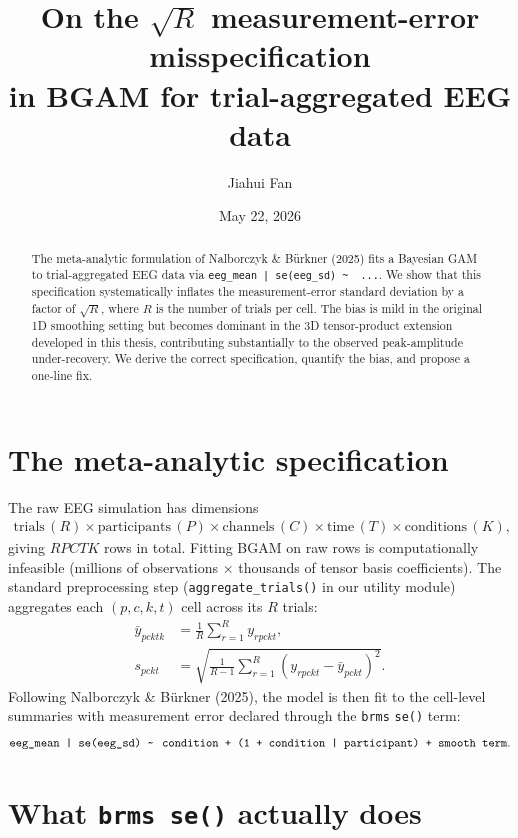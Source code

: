 \documentclass[11pt]{article}
\title{On the $\sqrt{R}$ measurement-error misspecification\\
in BGAM for trial-aggregated EEG data}
\author{Jiahui Fan}
\date{May 22, 2026}
\begin{document}
\maketitle

\begin{abstract}
The meta-analytic formulation of Nalborczyk \& B\"urkner (2025)
fits a Bayesian GAM to trial-aggregated EEG data via
\texttt{eeg\_mean | se(eeg\_sd) \textasciitilde\, ...}.
We show that this specification systematically inflates the
measurement-error standard deviation by a factor of $\sqrt{R}$,
where $R$ is the number of trials per cell. The bias is mild in
the original 1D smoothing setting but becomes dominant in the
3D tensor-product extension developed in this thesis, contributing
substantially to the observed peak-amplitude under-recovery.
We derive the correct specification, quantify the bias, and propose
a one-line fix.
\end{abstract}

\section{The meta-analytic specification}

The raw EEG simulation has dimensions
\begin{align*}
\text{trials}\,(R) \times \text{participants}\,(P)
\times \text{channels}\,(C) \times \text{time}\,(T)
\times \text{conditions}\,(K) ,
\end{align*}
giving $RPCTK$ rows in total. Fitting BGAM on raw rows is
computationally infeasible (millions of observations $\times$
thousands of tensor basis coefficients). The standard
preprocessing step (\texttt{aggregate\_trials()} in our utility
module) aggregates each $(p, c, k, t)$ cell across its $R$ trials:
\begin{align*}
\bar y_{pcktk} &= \frac{1}{R}\sum_{r=1}^{R} y_{rpck t},\\
s_{pck t}     &= \sqrt{\frac{1}{R-1}\sum_{r=1}^{R}
                 (y_{rpck t} - \bar y_{pck t})^2}.
\end{align*}
Following Nalborczyk \& B\"urkner (2025), the model is then fit
to the cell-level summaries with measurement error declared
through the \texttt{brms} \texttt{se()} term:
\begin{equation}
\texttt{eeg\_mean | se(eeg\_sd) \textasciitilde\,
condition + (1 + condition | participant) + smooth term}.
\label{eq:nb-formula}
\end{equation}

\section{What \texttt{brms se()} actually does}
\end{document}
